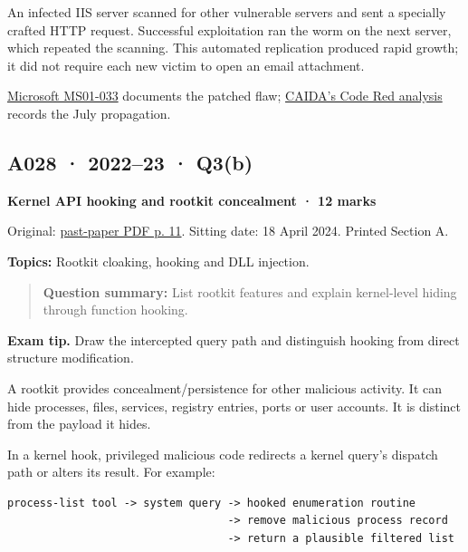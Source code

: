 \documentclass[11pt,a4paper]{article}
\begin{document}
An infected IIS server scanned for other vulnerable servers and sent a specially crafted HTTP request. Successful exploitation ran the worm on the next server,\allowbreak{} which repeated the scanning. This automated replication produced rapid growth; it did not require each new victim to open an email attachment.


\href{https://learn.microsoft.com/en-us/security-updates/securitybulletins/2001/ms01-033}{Microsoft MS01-033} documents the patched flaw; \href{https://www.caida.org/archive/code-red/}{CAIDA's Code Red analysis} records the July propagation.




\clearpage
\subsection{A028 · 2022–23 · Q3(b)}\label{a028}

\textbf{Kernel API hooking and rootkit concealment · 12 marks}


Original: \href{../../CSE405-Security_Merged.pdf\#page=11}{past-paper PDF p. 11}. Sitting date: 18 April 2024. Printed Section A.


\textbf{Topics:} Rootkit cloaking,\allowbreak{} hooking and DLL injection.



\begin{quote}\small

\textbf{Question summary:} List rootkit features and explain kernel-level hiding through function hooking.



\end{quote}


{\color{ForestGreen}\textbf{Exam tip.} Draw the intercepted query path and distinguish hooking from direct structure modification.}


A rootkit provides concealment/\allowbreak{}persistence for other malicious activity. It can hide processes,\allowbreak{} files,\allowbreak{} services,\allowbreak{} registry entries,\allowbreak{} ports or user accounts. It is distinct from the payload it hides.


In a kernel hook,\allowbreak{} privileged malicious code redirects a kernel query's dispatch path or alters its result. For example:



\begin{Verbatim}[breaklines=true,breakanywhere=true,fontsize=\small,frame=single,rulecolor=\color{PanelBorder}]
process-list tool -> system query -> hooked enumeration routine
                                  -> remove malicious process record
                                  -> return a plausible filtered list
\end{Verbatim}
\end{document}
